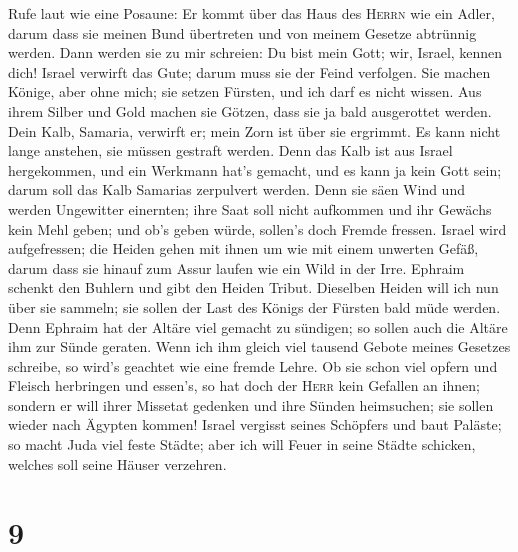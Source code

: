  Rufe laut wie eine Posaune: Er kommt über das Haus des
\textsc{Herrn} wie ein Adler, darum dass sie meinen Bund übertreten und
von meinem Gesetze abtrünnig werden.  Dann werden sie zu
mir schreien: Du bist mein Gott; wir, Israel, kennen dich!
 Israel verwirft das Gute; darum muss sie der Feind
verfolgen.  Sie machen Könige, aber ohne mich; sie setzen
Fürsten, und ich darf es nicht wissen. Aus ihrem Silber und Gold machen
sie Götzen, dass sie ja bald ausgerottet werden.  Dein
Kalb, Samaria, verwirft er; mein Zorn ist über sie ergrimmt. Es kann
nicht lange anstehen, sie müssen gestraft werden.  Denn
das Kalb ist aus Israel hergekommen, und ein Werkmann hat's gemacht, und
es kann ja kein Gott sein; darum soll das Kalb Samarias zerpulvert
werden.  Denn sie säen Wind und werden Ungewitter
einernten; ihre Saat soll nicht aufkommen und ihr Gewächs kein Mehl
geben; und ob's geben würde, sollen's doch Fremde fressen.
 Israel wird aufgefressen; die Heiden gehen mit ihnen um
wie mit einem unwerten Gefäß,  darum dass sie hinauf zum
Assur laufen wie ein Wild in der Irre. Ephraim schenkt den Buhlern und
gibt den Heiden Tribut.  Dieselben Heiden will ich nun
über sie sammeln; sie sollen der Last des Königs der Fürsten bald müde
werden.  Denn Ephraim hat der Altäre viel gemacht zu
sündigen; so sollen auch die Altäre ihm zur Sünde geraten.
 Wenn ich ihm gleich viel tausend Gebote meines Gesetzes
schreibe, so wird's geachtet wie eine fremde Lehre.  Ob
sie schon viel opfern und Fleisch herbringen und essen's, so hat doch
der \textsc{Herr} kein Gefallen an ihnen; sondern er will ihrer Missetat
gedenken und ihre Sünden heimsuchen; sie sollen wieder nach Ägypten
kommen!  Israel vergisst seines Schöpfers und baut
Paläste; so macht Juda viel feste Städte; aber ich will Feuer in seine
Städte schicken, welches soll seine Häuser verzehren.

\hypertarget{section-8}{%
\section{9}\label{section-8}}

